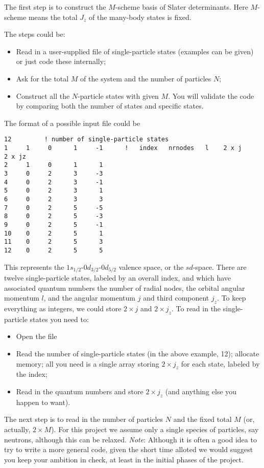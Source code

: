 The first step  is to construct the $M$-scheme basis of Slater determinants.
Here $M$-scheme means the total $J_z$ of the many-body states is fixed.

The steps could be:

\begin{itemize}

\item  Read in a user-supplied file of single-particle states (examples can be given) or just code these internally;

\item Ask for the total $M$ of the system and the number of particles $N$;

\item Construct all the $N$-particle states with given $M$.  You will validate the code by 
comparing both the number of states and specific states.

\end{itemize}
The format of a possible input  file could be

\begin{verbatim}
12         ! number of single-particle states
1     1     0      1     -1      !   index   nrnodes   l    2 x j      2 x jz
2     1     0      1      1
3     0     2      3     -3
4     0     2      3     -1
5     0     2      3      1
6     0     2      3      3
7     0     2      5     -5
8     0     2      5     -3
9     0     2      5     -1
10    0     2      5      1
11    0     2      5      3
12    0     2      5      5
\end{verbatim}

This represents the $1s_{1/2}$-$0d_{3/2}$-$0d_{5/2}$ valence space, or the $sd$-space.  There are 
twelve single-particle states, labeled by an overall index, and which have associated quantum 
numbers the number of radial nodes, the orbital angular momentum $l$, and the 
angular momentum $j$ and third component $j_z$.  To keep everything as integers, we could store $2 \times j$ and 
$2 \times j_z$. 
To read in the single-particle states you need to:
\medskip

\begin{itemize}


\item Open the file 

\item  Read the number of single-particle states (in the above example, 12);  allocate memory; all you need is a single array storing $2\times j_z$ for each state, labeled by 
the index;

\item Read in the quantum numbers and store $2 \times j_z$ (and anything else you happen to want).

\end{itemize}
The next step is to read in the number of particles $N$ and the fixed total $M$ (or, actually, $2 \times M$). 
For this project we assume only a single species of particles, say neutrons, although this can be 
relaxed. \textit{Note}: Although it is often a good idea to try to write a more general code, given the 
short time alloted we would suggest you keep your ambition in check, at least in the initial phases of the 
project.  


